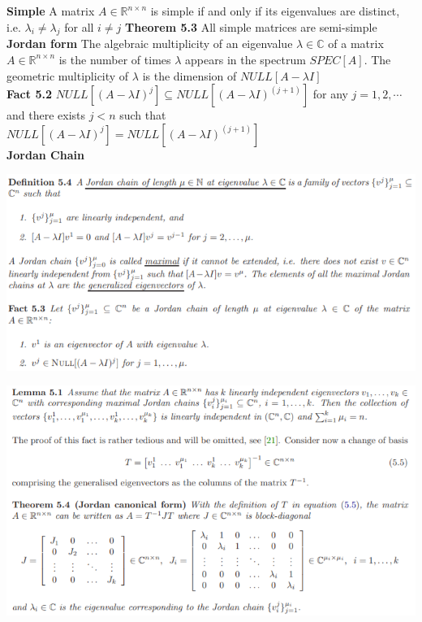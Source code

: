 \documentclass[10pt,landscape]{article}
\newenvironment{Figure}
{\par\medskip\noindent\minipage{\linewidth}}
{\endminipage\par\medskip}
\begin{document}
\begin{multicols*}{4}
\textbf{Simple} A matrix $A \in \mathbb{R}^{n \times n}$ is simple if and only if its eigenvalues are distinct, i.e. $\lambda_i \neq \lambda_j$ for all $i \neq j$
\textbf{Theorem 5.3} All simple matrices are semi-simple\\

\textbf{Jordan form} The algebraic multiplicity of an eigenvalue $\lambda \in \mathbb{C}$ of a matrix $A \in \mathbb{R}^{n \times n}$ is the number of times $\lambda$ appears in the spectrum $SPEC[A]$. The geometric multiplicity of $\lambda$ is the dimension of $NULL[A - \lambda I]$\\

\textbf{Fact 5.2} $NULL[(A - \lambda I)^j] \subseteq NULL[(A - \lambda I)^(j+1)]$ for any $j = 1, 2, \cdots$ and there exists $j < n$ such that 
$NULL[(A - \lambda I)^j] = NULL[(A - \lambda I)^(j+1)]$ \\

\textbf{Jordan Chain}
\begin{Figure}
	\centering
	\includegraphics[width=\linewidth]{pictures/Fac5_4.png}
\end{Figure}

\begin{Figure}
	\centering
	\includegraphics[width=\linewidth]{pictures/lem5_1.png}
\end{Figure}


\end{multicols*}
\end{document}

